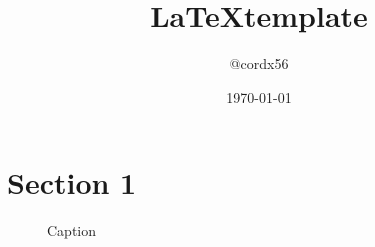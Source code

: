\documentclass[a4j,11pt,uplatex]{jsarticle}
\title{\LaTeX template}
\author{@cordx56}
\date{\today}
\begin{document}
\begin{titlepage}
\maketitle
\thispagestyle{empty}
\end{titlepage}

\tableofcontents
\newpage

\section{Section 1}
\begin{figure}[htbp]
	\centering
	\caption{Caption}
\end{figure}
\end{document}

